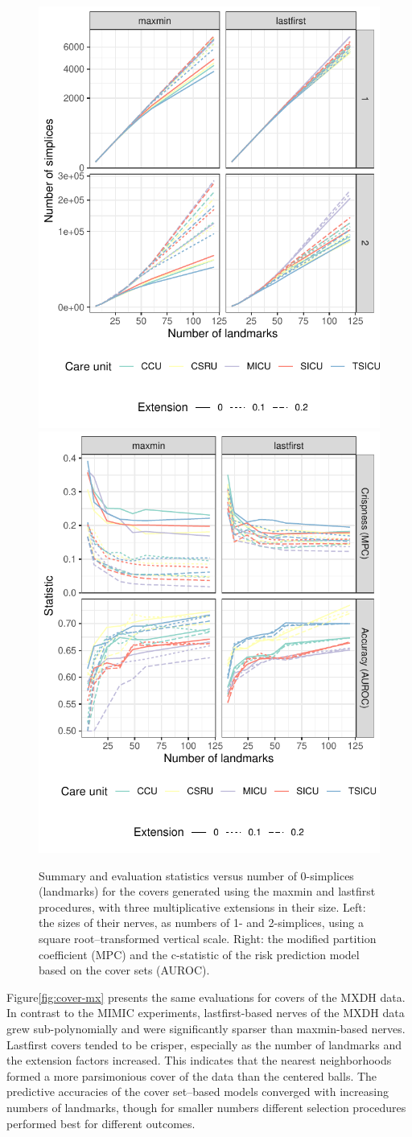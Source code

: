 \documentclass{article}
\begin{document}
\begin{figure}
\includegraphics[width=.5\textwidth]{../figures/cover-simplices}
\includegraphics[width=.5\textwidth]{../figures/cover-evaluate}
\caption{
Summary and evaluation statistics versus number of 0-simplices (landmarks) for the covers generated using the maxmin and lastfirst procedures, with three multiplicative extensions in their size.
Left: the sizes of their nerves, as numbers of 1- and 2-simplices, using a square root--transformed vertical scale.
Right: the modified partition coefficient (MPC) and the c-statistic of the risk prediction model based on the cover sets (AUROC).
\label{fig:cover-mimic}
}
\end{figure}

Figure\nbs\ref{fig:cover-mx} presents the same evaluations for covers of
the MXDH data. In contrast to the MIMIC experiments, lastfirst-based
nerves of the MXDH data grew sub-polynomially and were significantly
sparser than maxmin-based nerves. Lastfirst covers tended to be crisper,
especially as the number of landmarks and the extension factors
increased. This indicates that the nearest neighborhoods formed a more
parsimonious cover of the data than the centered balls. The predictive
accuracies of the cover set--based models converged with increasing
numbers of landmarks, though for smaller numbers different selection
procedures performed best for different outcomes.
\end{document}
